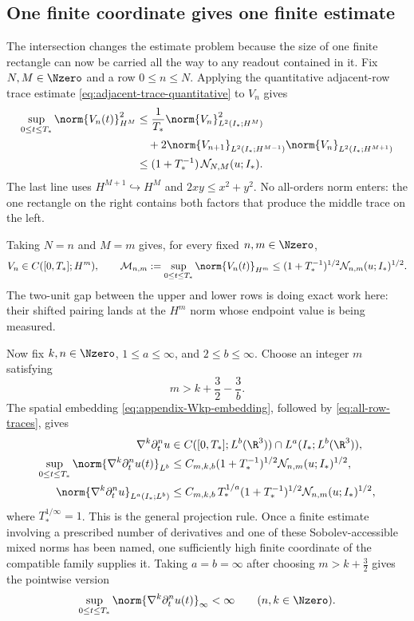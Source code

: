 \subsection{One finite coordinate gives one finite estimate}

The intersection changes the estimate problem because the size of one finite
rectangle can now be carried all the way to any readout contained in it.  Fix
\(N,M\in\Nzero\) and a row \(0\le n\le N\).  Applying the quantitative
adjacent-row trace estimate \eqref{eq:adjacent-trace-quantitative} to \(V_n\)
gives
\begin{align}
 \sup_{0\le t\le T_*}\norm{V_n(t)}_{H^M}^2
 &\le \frac1{T_*}\norm{V_n}_{L^2(I_*;H^M)}^2
 \notag\\
 &\quad+2
 \norm{V_{n+1}}_{L^2(I_*;H^{M-1})}
 \norm{V_n}_{L^2(I_*;H^{M+1})}
 \notag\\
 &\le (1+T_*^{-1})\,
 \mathcal N_{N,M}(u;I_*).
 \label{eq:rectangle-to-trace}
\end{align}
The last line uses \(H^{M+1}\hookrightarrow H^M\) and
\(2xy\le x^2+y^2\).  No all-orders norm enters: the one rectangle on the
right contains both factors that produce the middle trace on the left.

Taking \(N=n\) and \(M=m\) gives, for every fixed \(n,m\in\Nzero\),
\begin{equation}
 V_n\in C([0,T_*];H^m),
 \qquad
 \mathcal M_{n,m}
 :=\sup_{0\le t\le T_*}\norm{V_n(t)}_{H^m}
 \le (1+T_*^{-1})^{1/2}
 \mathcal N_{n,m}(u;I_*)^{1/2}.
 \label{eq:all-row-traces}
\end{equation}
The two-unit gap between the upper and lower rows is doing exact work here:
their shifted pairing lands at the \(H^m\) norm whose endpoint value is being
measured.

Now fix \(k,n\in\Nzero\), \(1\le a\le\infty\), and
\(2\le b\le\infty\).  Choose an integer \(m\) satisfying
\[
 m>k+\frac32-\frac3b.
\]
The spatial embedding \eqref{eq:appendix-Wkp-embedding}, followed by
\eqref{eq:all-row-traces}, gives
\begin{equation}
 \begin{aligned}
  \nabla^k\partial_t^n u
  &\in C([0,T_*];L^b(\R^3))
    \cap L^a(I_*;L^b(\R^3)),\\
  \sup_{0\le t\le T_*}
  \norm{\nabla^k\partial_t^n u(t)}_{L^b}
  &\le C_{m,k,b}(1+T_*^{-1})^{1/2}
  \mathcal N_{n,m}(u;I_*)^{1/2},\\
  \norm{\nabla^k\partial_t^n u}_{L^a(I_*;L^b)}
  &\le C_{m,k,b}\,T_*^{1/a}(1+T_*^{-1})^{1/2}
  \mathcal N_{n,m}(u;I_*)^{1/2},
 \end{aligned}
 \label{eq:finite-projection-mixed-norms}
\end{equation}
where \(T_*^{1/\infty}=1\).  This is the general projection rule.  Once a
finite estimate involving a prescribed number of derivatives and one of these
Sobolev-accessible mixed norms has been named, one sufficiently high finite
coordinate of the compatible family supplies it.
Taking \(a=b=\infty\) after choosing \(m>k+\frac32\) gives the pointwise
version
\[
 \sup_{0\le t\le T_*}
 \norm{\nabla^k\partial_t^n u(t)}_\infty<\infty
 \qquad(n,k\in\Nzero).
\]

